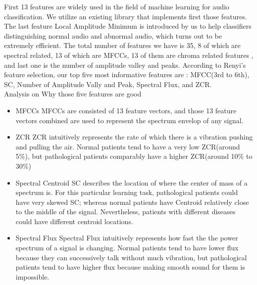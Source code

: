 \indent First 13 features are widely used in the field of machine learning for audio classification\cite{b26}\cite{b27}. We utilize an existing library\cite{b6} that implements first those features. The last feature Local Amplitude Minimum is introduced by us to help classifiers distinguishing normal audio and abnormal audio, which turns out to be extremely efficient. The total number of features we have is 35, 8 of which are spectral related, 13 of which are MFCCs, 13 of them are chroma related features , and last one is the number of amplitude valley and peaks. According to Renyi's feature selection, our top five most informative features are : MFCC(3rd to 6th), SC, Number of Amplitude Vally and Peak, Spectral Flux, and ZCR. \\
Analysis on Why those five features are good
\begin{itemize}
	\item MFCCs
	MFCCs are consisted of 13 feature vectors, and those 13 feature vectors combined are used to represent the spectrum envelop of any signal. 
	\item ZCR
	ZCR intuitively represents the rate of which there is a vibration pushing and pulling the air. Normal patients tend to have a very low ZCR(around 5\%), but pathological patients comparably have a higher ZCR(around 10\% to 30\%)
	\item Spectral Centroid 
	SC describes the location of where the center of mass of a spectrum is. For this particular learning task, pathological patients could have very skewed SC; whereas normal patients have Centroid relatively close to the middle of the signal. Nevertheless, patients with different diseases could have different centroid locations.  
	\item Spectral Flux
	Spectral Flux intuitively represents how fast the the power spectrum of a signal is changing. Normal patients tend to have lower flux because they can successively talk without much vibration, but pathological patients tend to have higher flux because making smooth sound for them is impossible. 
\end{itemize}